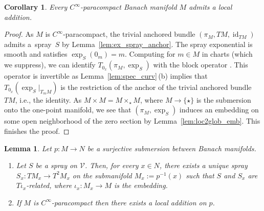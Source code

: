 \documentclass[11pt]{article}
\numberwithin{equation}{section}
\numberwithin{equation}{section}
\newtheorem{Corollary}[Theorem]{Corollary}
\newtheorem{Lemma}[Theorem]{Lemma}
\newcommand{\cV}{\ensuremath{\mathcal{V}}}
\DeclareMathOperator{\id}{id}
\begin{document}
\begin{Corollary}\label{cor:exp_locadd}
Every $C^\infty$-paracompact Banach manifold $M$ admits a local addition.
\end{Corollary}
\begin{proof}\hspace{-1pt}As $M$ is $C^\infty$-paracompact, the trivial anchored bundle $(\pi_M,TM, \id_{TM})$ admits a~spray~$S$ by Lemma~\ref{lem:ex_spray_anchor}. The spray exponential is smooth and satisfies $\exp_S (0_m)=m$. Computing for $m\in M$ in charts (which we suppress), we can identify $T_{0_x} (\pi_M,\exp_S)$ with the block operator \smash{$\bigl[\begin{smallmatrix} \id & 0 \\ \star & T_{0_x} (\exp_S|_{T_mM})\end{smallmatrix}\bigr]$}. This operator is invertible as Lemma~\ref{lem:spec_curv}\,(b) implies that $T_{0_x} (\exp_S|_{T_mM})$ is the restriction of the anchor of the trivial anchored bundle~$TM$, i.e., the identity. As $M\times M = M\times_{\star} M$, where $M\rightarrow \{\star\}$ is the submersion onto the one-point manifold, we see that $(\pi_M,\exp_S)$ induces an embedding on some open neighborhood of the zero section by Lemma~\ref{lem:loc2glob_emb}. This finishes the proof.
\end{proof}

\begin{Lemma}\label{lem:con_loc_add_subm}
Let $p\colon M \rightarrow N$ be a surjective submersion between Banach manifolds.
\begin{enumerate}\itemsep=0pt
\item[\textup{(a)}] Let $S$ be a spray on $\cV$.
Then, for every $x \in N$, there exists a unique spray ${S_{x}\colon\! TM_{x}\! \rightarrow\! T^{2}M_{x}}$ on the submanifold $M_x := p^{-1}(x)$ such that $S$ and $S_x$ are $T\iota_x$-related, where $\iota_x \colon M_x \rightarrow M$ is the embedding.
\item[\textup{(b)}] If $M$ is $C^\infty$-paracompact then there exists a local addition on $p$.
\end{enumerate}
\end{Lemma}
\end{document}
